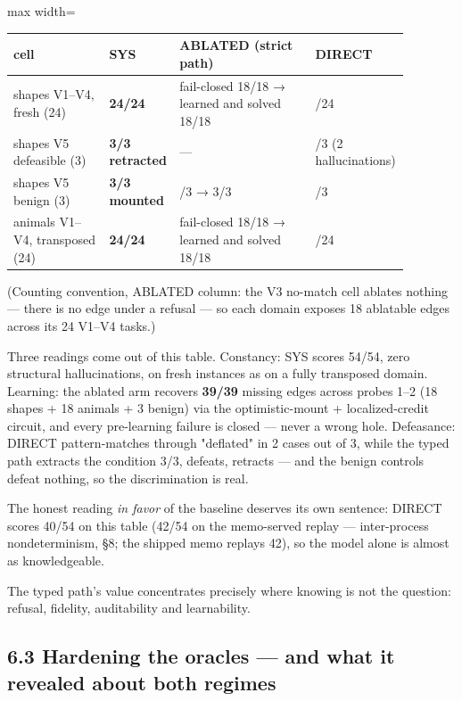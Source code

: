\documentclass[11pt]{article}
\begin{document}
\begin{center}\small\begin{adjustbox}{max width=\linewidth}\begin{tabular}{>{\raggedright\arraybackslash}p{0.240\linewidth}>{\raggedright\arraybackslash}p{0.112\linewidth}>{\raggedright\arraybackslash}p{0.344\linewidth}>{\raggedright\arraybackslash}p{0.180\linewidth}}\toprule
cell & SYS & ABLATED (strict path) & DIRECT \\ \midrule
shapes V1–V4, fresh (24) & \textbf{24/24} & fail-closed 18/18 → learned and solved 18/18 & 20/24 \\
shapes V5 defeasible (3) & \textbf{3/3 retracted} & — & 1/3 (2 hallucinations) \\
shapes V5 benign (3) & \textbf{3/3 mounted} & 3/3 → 3/3 & 3/3 \\
animals V1–V4, transposed (24) & \textbf{24/24} & fail-closed 18/18 → learned and solved 18/18 & 16/24 \\
\bottomrule\end{tabular}\end{adjustbox}\end{center}

(Counting convention, ABLATED column: the V3 no-match cell ablates nothing — there is no edge under a refusal — so each domain exposes 18 ablatable edges across its 24 V1–V4 tasks.)

Three readings come out of this table. Constancy: SYS scores 54/54, zero structural hallucinations, on fresh instances as on a fully transposed domain. Learning: the ablated arm recovers \textbf{39/39} missing edges across probes 1–2 (18 shapes + 18 animals + 3 benign) via the optimistic-mount + localized-credit circuit, and every pre-learning failure is closed — never a wrong hole. Defeasance: DIRECT pattern-matches through "deflated" in 2 cases out of 3, while the typed path extracts the condition 3/3, defeats, retracts — and the benign controls defeat nothing, so the discrimination is real.

The honest reading \emph{in favor} of the baseline deserves its own sentence: DIRECT scores 40/54 on this table (42/54 on the memo-served replay — inter-process nondeterminism, §8; the shipped memo replays 42), so the model alone is almost as knowledgeable.

The typed path's value concentrates precisely where knowing is not the question: refusal, fidelity, auditability and learnability.

\subsection*{6.3 Hardening the oracles — and what it revealed about both regimes}
\end{document}

